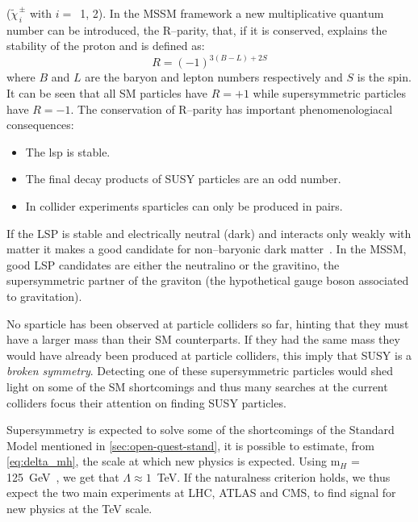 ($\widetilde{\chi}^{\, \pm}_{\, i}$ with $i = $~1, 2). In the MSSM framework a
new multiplicative quantum number can be introduced, the R--parity, that, if it
is conserved, explains the stability of the proton and is defined as:
\begin{equation}
  \label{eq:91}
  R = (-1)^{3(B - L) + 2S}
\end{equation}
where $B$ and $L$ are the baryon and lepton numbers respectively and $S$ is the
spin. It can be seen that all SM particles have $R = + 1$ while supersymmetric
particles have $R = -1$. The conservation of R--parity has important
phenomenologiacal consequences:
\begin{itemize}
\item The \gls{lsp} is stable.
\item The final decay products of SUSY particles are an odd number.
\item In collider experiments sparticles can only be produced in pairs.
\end{itemize}
If the LSP is stable and electrically neutral (dark) and interacts only weakly
with matter it makes a good candidate for non--baryonic dark
matter~\cite{WIMPS}. In the MSSM, good LSP candidates are either the neutralino
or the gravitino, the supersymmetric partner of the graviton (the hypothetical
gauge boson associated to gravitation).

No sparticle has been observed at particle colliders so far, hinting that they
must have a larger mass than their SM counterparts. If they had the same mass
they would have already been produced at particle colliders, this imply that SUSY is
a \emph{broken symmetry}. Detecting one of these supersymmetric particles would
shed light on some of the SM shortcomings and thus many searches at the current
colliders focus their attention on finding SUSY particles.

Supersymmetry is expected to solve some of the shortcomings of the Standard
Model mentioned in \cref{sec:open-quest-stand}, it is possible to estimate, from
\cref{eq:delta_mh}, the scale at which new physics is expected. Using m$_H$ =
125~GeV~\cite{PDG}, we get that $\Lambda \approx 1$~TeV. If the naturalness
criterion holds, we thus expect the two main experiments at LHC, ATLAS and CMS,
to find signal for new physics at the TeV scale.
